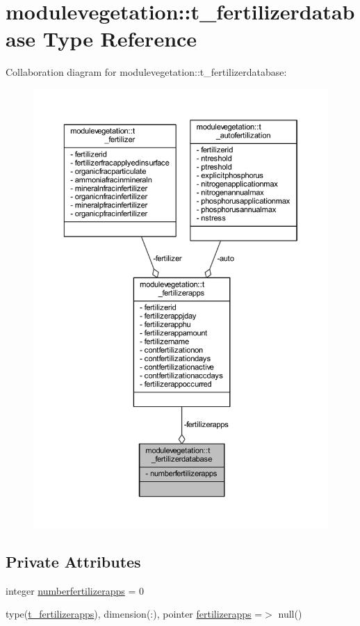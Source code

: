 \hypertarget{structmodulevegetation_1_1t__fertilizerdatabase}{}\section{modulevegetation\+:\+:t\+\_\+fertilizerdatabase Type Reference}
\label{structmodulevegetation_1_1t__fertilizerdatabase}


Collaboration diagram for modulevegetation\+:\+:t\+\_\+fertilizerdatabase\+:\nopagebreak
\begin{figure}[H]
\begin{center}
\leavevmode
\includegraphics[width=350pt]{structmodulevegetation_1_1t__fertilizerdatabase__coll__graph}
\end{center}
\end{figure}
\subsection*{Private Attributes}
\begin{DoxyCompactItemize}
\item 
integer \mbox{\hyperlink{structmodulevegetation_1_1t__fertilizerdatabase_ac45f33e0b8919722c9a05b92956a3ed5}{numberfertilizerapps}} = 0
\item 
type(\mbox{\hyperlink{structmodulevegetation_1_1t__fertilizerapps}{t\+\_\+fertilizerapps}}), dimension(\+:), pointer \mbox{\hyperlink{structmodulevegetation_1_1t__fertilizerdatabase_ae9da9ce377922153707c4079d7c9685c}{fertilizerapps}} =$>$ null()
\end{DoxyCompactItemize}


